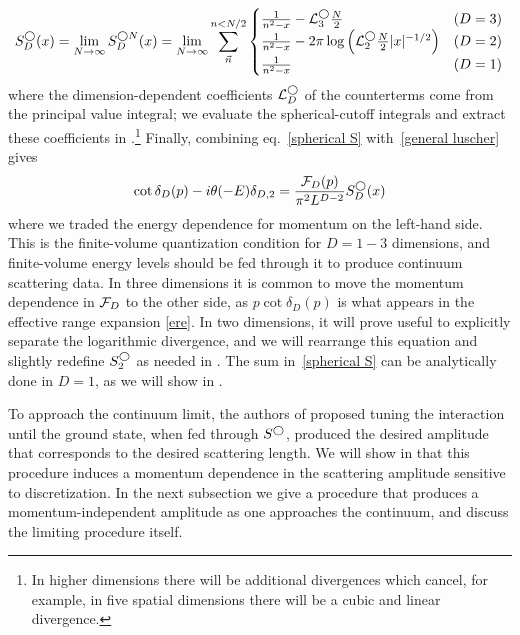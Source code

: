 \begin{equation}\label{eq:spherical S}
    S^\bigcirc_D(x)
    =
    \lim_{N\rightarrow\infty} S^{\bigcirc N}_D(x)
    =
    \lim_{N\rightarrow\infty} \sum_{\vec{n}}^{n < N/2}
    \begin{cases}
     \frac{1}{n^2-x} - \mathcal{L}_3^\bigcirc \frac{N}{2}& (D=3)\\
     \frac{1}{n^2-x} - 2\pi\log\left(\mathcal{L}_2^\bigcirc\frac{N}{2}|x|^{-1/2}\right)& (D=2)\\
    \frac{1}{n^2-x} & (D=1)
     \end{cases}
\end{equation}
where the dimension-dependent coefficients $\mathcal{L}_D^\bigcirc$ of the counterterms come from the principal value integral; we evaluate the spherical-cutoff integrals and extract these coefficients in .\footnote{
In higher dimensions there will be additional divergences which cancel, for example, in five spatial dimensions there will be a cubic and linear divergence.
}
Finally, combining eq.~\eqref{spherical S} with~\eqref{general luscher} gives
\begin{equation}\label{eq:spherical quantization}
    \cot \delta_{D}(p)-i\theta(-E)\delta_{D,2} = \frac{\mathcal{F}_{D}(p)}{\pi^2 L^{D-2}} S^\bigcirc_D(x)
\end{equation}
where we traded the energy dependence for momentum on the left-hand side.
This is the \Luscher finite-volume quantization condition for $D=1-3$ dimensions, and finite-volume energy levels should be fed through it to produce continuum scattering data.
In three dimensions it is common to move the momentum dependence in $\mathcal{F}_{D}$ to the other side, as $p \cot\delta_{D}(p)$ is what appears in the effective range expansion \eqref{ere}.
In two dimensions, it will prove useful to explicitly separate the logarithmic divergence, and we will rearrange this equation and slightly redefine $S^\bigcirc_2$ as needed in .  The sum in~\eqref{spherical S} can be analytically done in $D=1$, as we will show in .


To approach the continuum limit, the authors of  proposed tuning the interaction until the ground state, when fed through $S^\bigcirc$, produced the desired amplitude that corresponds to the desired scattering length.
We will show in  that this procedure induces a momentum dependence in the scattering amplitude sensitive to discretization.
In the next subsection we give a procedure that produces a momentum-independent amplitude as one approaches the continuum, and discuss the limiting procedure itself.
